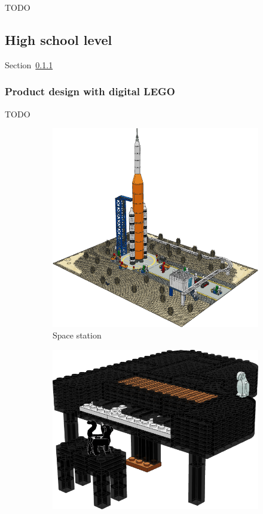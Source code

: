 \documentclass{PDS}
\begin{document}
TODO

\subsection{High school level}
\label{sec:school}

Section~\ref{sec:school-lego}

\subsubsection{Product design with digital LEGO}
\label{sec:school-lego}

TODO

\begin{figure}[htbp]
    \centering
    \begin{subfigure}[b]{0.3\textwidth}
        \centering
        \includegraphics[width=\textwidth]{./figures/space.png}
        \caption{Space station}
        \label{fig:rocket}
    \end{subfigure}
    \hfill
    \begin{subfigure}[b]{0.3\textwidth}
        \centering
        \includegraphics[width=\textwidth]{./figures/piano.png}

\end{subfigure}
\end{figure}
\end{document}

